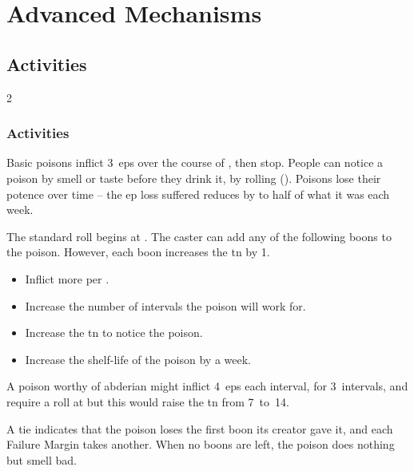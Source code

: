 \chapter{Advanced Mechanisms}

\label{skill_uses}

\section{Activities}

\begin{multicols}{2}

\togglefalse{examplecharacter}

\subsection{ Activities}
\label{downtimeActions}


Basic poisons inflict 3~\glspl{ep} over the course of , then stop.
People can notice a poison by smell or taste before they drink it, by rolling  (\tn[7]).
Poisons lose their potence over time -- the \gls{ep} loss suffered reduces by to half of what it was each week.

The standard roll begins at \tn[7].
The caster can add any of the following boons to the poison.
However, each boon increases the \gls{tn} by 1.

\begin{itemize}
  \item
  Inflict  more per .
  \item
  Increase the number of \glspl{interval} the poison will work for.
  \item
  Increase the \gls{tn} to notice the poison.
  \item
  Increase the shelf-life of the poison by a week.
\end{itemize}

A poison worthy of \gls{abderian} might inflict 4~\glspl{ep} each \gls{interval}, for 3~\glspl{interval}, and require a  roll at \tn[10] but this would raise the \gls{tn} from 7~to~14.

A tie indicates that the poison loses the first boon its creator gave it, and each Failure Margin takes another.
When no boons are left, the poison does nothing but smell bad.


\end{multicols}
